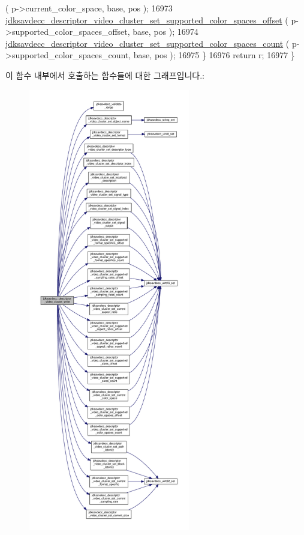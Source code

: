 \begin{DoxyCode}
      ( p->current\_color\_space, base, pos );
16973         \hyperlink{group__descriptor__video__cluster_gadce5e49145c880983cd98ed174db214c}{jdksavdecc\_descriptor\_video\_cluster\_set\_supported\_color\_spaces\_offset}
      ( p->supported\_color\_spaces\_offset, base, pos );
16974         \hyperlink{group__descriptor__video__cluster_ga15df91f2e4bd9436bc56c2481fdb6e71}{jdksavdecc\_descriptor\_video\_cluster\_set\_supported\_color\_spaces\_count}
      ( p->supported\_color\_spaces\_count, base, pos );
16975     \}
16976     \textcolor{keywordflow}{return} r;
16977 \}
\end{DoxyCode}


이 함수 내부에서 호출하는 함수들에 대한 그래프입니다.\+:
\nopagebreak
\begin{figure}[H]
\begin{center}
\leavevmode
\includegraphics[height=550pt]{group__descriptor__video__cluster_ga0cfb32aa2c477ac66765b2a7459fb7e2_cgraph}
\end{center}
\end{figure}


